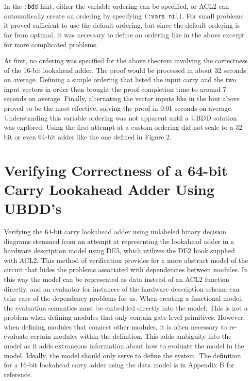 \documentclass[fleqn,10pt]{SelfArx} %
\begin{document}
In the \lstinline{:bdd} hint, either the variable ordering can be specified, or ACL2 can automatically create an ordering by specifying \lstinline{(:vars nil)}. For small problems it proved sufficient to use the default ordering, but since the default ordering is far from optimal, it was necessary to define an ordering like in the above excerpt for more complicated problems.

At first, no ordering was specified for the above theorem involving the correctness of the 16-bit lookahead adder. The proof would be processed in about 32 seconds on average. Defining a simple ordering that listed the input carry and the two input vectors in order then brought the proof completion time to around 7 seconds on average. Finally, alternating the vector inputs like in the hint above proved to be the most effective, solving the proof in 0.01 seconds on average. Understanding this variable ordering was not apparent until a UBDD solution was explored. Using the first attempt at a custom ordering did not scale to a 32-bit or even 64-bit adder like the one defined in Figure 2. 

\section{Verifying Correctness of a 64-bit Carry Lookahead Adder Using UBDD's}
Verifying the 64-bit carry lookahead adder using unlabeled binary decision diagrams stemmed from an attempt at representing the lookahead adder in a hardware description model using DE5, which utilizes the DE2 book supplied with ACL2. This method of verification provides for a more abstract model of the circuit that hides the problems associated with dependencies between modules. In this way the model can be represented as data instead of an ACL2 function directly, and an evaluator for instances of the hardware description schema can take care of the dependency problems for us. When creating a functional model, the evaluation semantics must be embedded directly into the model. This is not a problem when defining modules that only contain gate-level primitives. However, when defining modules that connect other modules, it is often necessary to re-evaluate certain modules within the definition. This adds ambiguity into the model as it adds extraneous information about how to evaluate the model in the model. Ideally, the model should only serve to define the system. The definition for a 16-bit lookahead carry adder using the data model is in Appendix B for reference.
\end{document}
